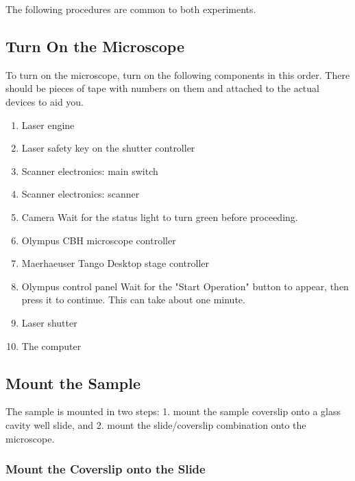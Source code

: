 \documentclass[10pt,a4paper,oneside]{book}
\begin{document}
The following procedures are common to both experiments.

\subsection{Turn On the Microscope}\label{sec:startup}

To turn on the microscope, turn on the following components in this order. There should be pieces of tape with numbers on them and attached to the actual devices to aid you.

\begin{enumerate}
    \item Laser engine
    \item Laser safety key on the shutter controller
    \item Scanner electronics: main switch
    \item Scanner electronics: scanner
    \item Camera \newline Wait for the status light to turn green before proceeding.
    \item Olympus CBH microscope controller
    \item Maerhaeuser Tango Desktop stage controller
    \item Olympus control panel \newline Wait for the "Start Operation" button to appear, then press it to continue. This can take about one minute.
    \item Laser shutter
    \item The computer
\end{enumerate}

\subsection{Mount the Sample}\label{sec:mount-sample}

The sample is mounted in two steps: 1. mount the sample coverslip onto a glass cavity well slide, and 2. mount the slide/coverslip combination onto the microscope.

\subsubsection{Mount the Coverslip onto the Slide}

\newline
\end{document}

